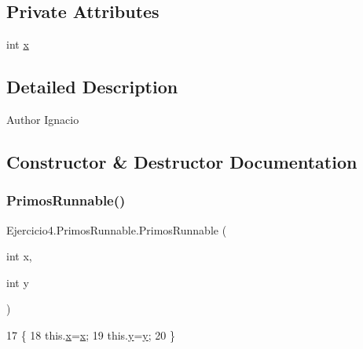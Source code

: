 \subsection*{Private Attributes}
\begin{DoxyCompactItemize}
\item 
int \mbox{\hyperlink{class_ejercicio4_1_1_primos_runnable_a6247d4ce772969a27b7c821a3c22f5c7}{x}}
\end{DoxyCompactItemize}


\subsection{Detailed Description}
\begin{DoxyAuthor}{Author}
Ignacio 
\end{DoxyAuthor}


\subsection{Constructor \& Destructor Documentation}
\mbox{\label{class_ejercicio4_1_1_primos_runnable_abfd36421668265d32914bd274deb0197}} 
\subsubsection{\texorpdfstring{Primos\+Runnable()}{PrimosRunnable()}}
{\footnotesize\ttfamily Ejercicio4.\+Primos\+Runnable.\+Primos\+Runnable (\begin{DoxyParamCaption}\item[{int}]{x,  }\item[{int}]{y }\end{DoxyParamCaption})\hspace{0.3cm}{\ttfamily [inline]}}


\begin{DoxyCode}
17                                        \{
18         this.\mbox{\hyperlink{class_ejercicio4_1_1_primos_runnable_a6247d4ce772969a27b7c821a3c22f5c7}{x}}=\mbox{\hyperlink{class_ejercicio4_1_1_primos_runnable_a6247d4ce772969a27b7c821a3c22f5c7}{x}};
19         this.\mbox{\hyperlink{class_ejercicio4_1_1_primos_runnable_af8c0c9f26577ea851dfb80040571a4f3}{y}}=\mbox{\hyperlink{class_ejercicio4_1_1_primos_runnable_af8c0c9f26577ea851dfb80040571a4f3}{y}};
20     \}
\end{DoxyCode}


